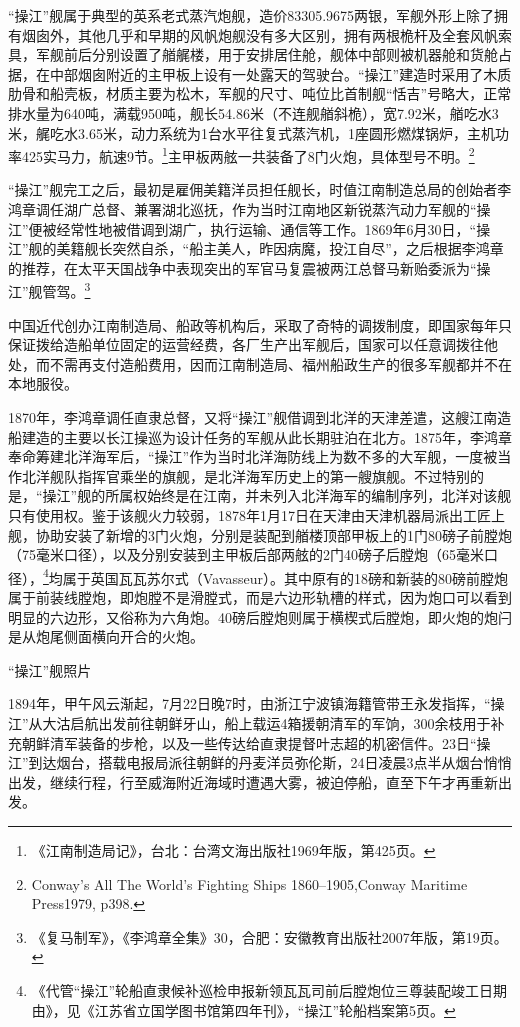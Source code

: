 \documentclass[12pt,UTF8]{ctexbook}
\begin{document}
“操江”舰属于典型的英系老式蒸汽炮舰，造价83305.9675两银，军舰外形上除了拥有烟囱外，其他几乎和早期的风帆炮舰没有多大区别，拥有两根桅杆及全套风帆索具，军舰前后分别设置了艏艉楼，用于安排居住舱，舰体中部则被机器舱和货舱占据，在中部烟囱附近的主甲板上设有一处露天的驾驶台。“操江”建造时采用了木质肋骨和船壳板，材质主要为松木，军舰的尺寸、吨位比首制舰“恬吉”号略大，正常排水量为640吨，满载950吨，舰长54.86米（不连舰艏斜桅），宽7.92米，艏吃水3米，艉吃水3.65米，动力系统为1台水平往复式蒸汽机，1座圆形燃煤锅炉，主机功率425实马力，航速9节。\footnote{《江南制造局记》，台北：台湾文海出版社1969年版，第425页。}主甲板两舷一共装备了8门火炮，具体型号不明。\footnote{Conway's All The World's Fighting Ships 1860--1905,Conway Maritime Press1979, p398.}

“操江”舰完工之后，最初是雇佣美籍洋员担任舰长，时值江南制造总局的创始者李鸿章调任湖广总督、兼署湖北巡抚，作为当时江南地区新锐蒸汽动力军舰的“操江”便被经常性地被借调到湖广，执行运输、通信等工作。1869年6月30日，“操江”舰的美籍舰长突然自杀，“船主美人，昨因病魔，投江自尽”，之后根据李鸿章的推荐，在太平天国战争中表现突出的军官马复震被两江总督马新贻委派为“操江”舰管驾。\footnote{《复马制军》，《李鸿章全集》30，合肥：安徽教育出版社2007年版，第19页。}

中国近代创办江南制造局、船政等机构后，采取了奇特的调拨制度，即国家每年只保证拨给造船单位固定的运营经费，各厂生产出军舰后，国家可以任意调拨往他处，而不需再支付造船费用，因而江南制造局、福州船政生产的很多军舰都并不在本地服役。

1870年，李鸿章调任直隶总督，又将“操江”舰借调到北洋的天津差遣，这艘江南造船建造的主要以长江操巡为设计任务的军舰从此长期驻泊在北方。1875年，李鸿章奉命筹建北洋海军后，“操江”作为当时北洋海防线上为数不多的大军舰，一度被当作北洋舰队指挥官乘坐的旗舰，是北洋海军历史上的第一艘旗舰。不过特别的是，“操江”舰的所属权始终是在江南，并未列入北洋海军的编制序列，北洋对该舰只有使用权。鉴于该舰火力较弱，1878年1月17日在天津由天津机器局派出工匠上舰，协助安装了新增的3门火炮，分别是装配到艏楼顶部甲板上的1门80磅子前膛炮（75毫米口径），以及分别安装到主甲板后部两舷的2门40磅子后膛炮（65毫米口径），\footnote{《代管“操江”轮船直隶候补巡检申报新领瓦瓦司前后膛炮位三尊装配竣工日期由》，见《江苏省立国学图书馆第四年刊》，“操江”轮船档案第5页。}均属于英国瓦瓦苏尔式（Vavasseur）。其中原有的18磅和新装的80磅前膛炮属于前装线膛炮，即炮膛不是滑膛式，而是六边形轨槽的样式，因为炮口可以看到明显的六边形，又俗称为六角炮。40磅后膛炮则属于横楔式后膛炮，即火炮的炮闩是从炮尾侧面横向开合的火炮。

“操江”舰照片

1894年，甲午风云渐起，7月22日晚7时，由浙江宁波镇海籍管带王永发指挥，“操江”从大沽启航出发前往朝鲜牙山，船上载运4箱援朝清军的军饷，300余枝用于补充朝鲜清军装备的步枪，以及一些传达给直隶提督叶志超的机密信件。23日“操江”到达烟台，搭载电报局派往朝鲜的丹麦洋员弥伦斯，24日凌晨3点半从烟台悄悄出发，继续行程，行至威海附近海域时遭遇大雾，被迫停船，直至下午才再重新出发。
\end{document}
